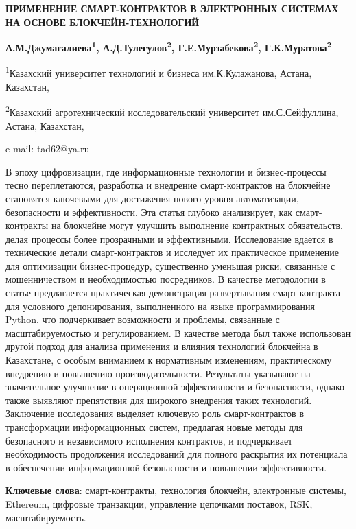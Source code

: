 \begin{center}
{\large\bfseries ПРИМЕНЕНИЕ СМАРТ-КОНТРАКТОВ В ЭЛЕКТРОННЫХ СИСТЕМАХ НА ОСНОВЕ
БЛОКЧЕЙН-ТЕХНОЛОГИЙ}

{\bfseries А.М.Джумагалиева\textsuperscript{1},
А.Д.Тулегулов\textsuperscript{2}, Г.Е.Мурзабекова\textsuperscript{2},
Г.К.Муратова\textsuperscript{2}}

\textsuperscript{1}Казахский университет технологий и бизнеса
им.К.Кулажанова, Астана, Казахстан,

\textsuperscript{2}Казахский агротехнический исследовательский
университет им.С.Сейфуллина, Астана, Казахстан,

e-mail: tad62@ya.ru
\end{center}

В эпоху цифровизации, где информационные технологии и бизнес-процессы
тесно переплетаются, разработка и внедрение смарт-контрактов на
блокчейне становятся ключевыми для достижения нового уровня
автоматизации, безопасности и эффективности. Эта статья глубоко
анализирует, как смарт-контракты на блокчейне могут улучшить выполнение
контрактных обязательств, делая процессы более прозрачными и
эффективными. Исследование вдается в технические детали смарт-контрактов
и исследует их практическое применение для оптимизации бизнес-процедур,
существенно уменьшая риски, связанные с мошенничеством и необходимостью
посредников. В качестве методологии в статье предлагается практическая
демонстрация развертывания смарт-контракта для условного депонирования,
выполненного на языке программирования Python, что подчеркивает
возможности и проблемы, связанные с масштабируемостью и регулированием.
В качестве метода был также использован другой подход для анализа
применения и влияния технологий блокчейна в Казахстане, с особым
вниманием к нормативным изменениям, практическому внедрению и повышению
производительности. Результаты указывают на значительное улучшение в
операционной эффективности и безопасности, однако также выявляют
препятствия для широкого внедрения таких технологий. Заключение
исследования выделяет ключевую роль смарт-контрактов в трансформации
информационных систем, предлагая новые методы для безопасного и
независимого исполнения контрактов, и подчеркивает необходимость
продолжения исследований для полного раскрытия их потенциала в
обеспечении информационной безопасности и повышении эффективности.

{\bfseries Ключевые слова}: смарт-контракты, технология блокчейн,
электронные системы, Ethereum, цифровые транзакции, управление цепочками
поставок, RSK, масштабируемость.

